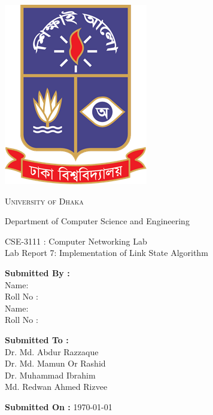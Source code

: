 \documentclass[11pt]{article}
\newcommand{\labNo}{7}
\newcommand{\labTitle}{Implementation of Link State Algorithm}
\begin{document}
\begin{titlepage}
    \begin{center}
        \includegraphics[scale=0.35]{du_logo.png}\par
        \begin{Huge}
            \textsc{University of Dhaka}\par
        \end{Huge}
        \begin{Large}
            Department of Computer Science and Engineering\par \vspace{1cm}
            CSE-3111 : Computer Networking Lab \\[12pt]    
            Lab Report \labNo : \labTitle
        \end{Large}
    \end{center}
    
    \vfill
    
    \begin{large}
        \begin{multicols}{2}
            \textbf{Submitted By :\\[12pt]}
                Name: \\[8pt]
                Roll No : \\[12pt]
                Name: \\[8pt]
                Roll No : \\[12pt]
                
            \columnbreak
            
            \noindent
            \textbf{Submitted To :\\[12pt]}
                Dr. Md. Abdur Razzaque\\[12pt]
                Dr. Md. Mamun Or Rashid\\[12pt]
                Dr. Muhammad Ibrahim\\[12pt]
                Md. Redwan Ahmed Rizvee
        \end{multicols}    
    \end{large} 
    
\textbf{Submitted On :} \today\\[20pt]

\end{titlepage}
\end{document}
